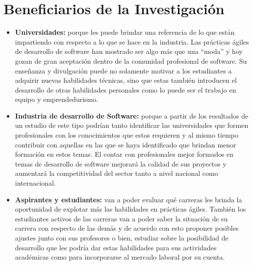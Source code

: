 \section{Beneficiarios de la Investigación}
\begin{itemize}
    \item \textbf{Universidades:} porque les puede brindar una referencia de lo que están impartiendo con respecto a lo que se hace en la industria. Las prácticas ágiles de desarrollo de software han mostrado ser algo más que una ``moda'' y hoy gozan de gran aceptación dentro de la comunidad profesional de software. Su enseñanza y divulgación puede no solamente motivar a los estudiantes a adquirir nuevas habilidades técnicas, sino que estas también introducen el desarrollo de otras habilidades personales como lo puede ser el trabajo en equipo y emprendedurismo.
    \item \textbf{Industria de desarrollo de Software:} porque a partir de los resultados de un estudio de este tipo podrían tanto identificar las universidades que formen profesionales con los conocimientos que estos requieren y al mismo tiempo contribuir con aquellas en las que se haya identificado que brindan menor formación en estos temas. El contar con profesionales mejor formados en temas de desarrollo de software mejorará la calidad de sus proyectos y aumentará la competitividad del sector tanto a nivel nacional como internacional.
    \item \textbf{Aspirantes y estudiantes:} van a poder evaluar qué carreras les brinda la oportunidad de explotar más las habilidades en prácticas ágiles. También los estudiantes activos de las carreras van a poder saber la situación de su carrera con respecto de las demás y de acuerdo con esto proponer posibles ajustes junto con sus profesores o bien, estudiar sobre la posibilidad de desarrollo que les podría dar estas habilidades para sus actividades académicas como para incorporarse al mercado laboral por su cuenta. 
\end{itemize}


